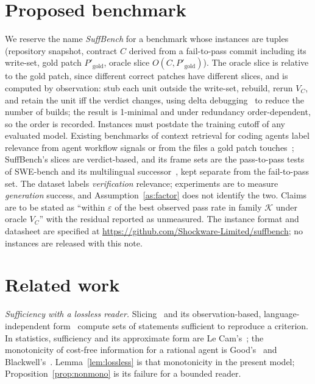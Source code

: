 \documentclass[10pt]{article}
\theoremstyle{definition}
\theoremstyle{plain}
\theoremstyle{remark}
\newcommand{\eps}{\varepsilon}
\newcommand{\Kfam}{\mathcal{K}}
\begin{document}
\section{Proposed benchmark}\label{sec:bench}

We reserve the name \emph{SuffBench} for a benchmark whose instances are tuples (repository snapshot, contract $C$ derived from a fail-to-pass commit including its write-set, gold patch $P'_{\text{gold}}$, oracle slice $O(C, P'_{\text{gold}})$). The oracle slice is relative to the gold patch, since different correct patches have different slices, and is computed by observation: stub each unit outside the write-set, rebuild, rerun $V_C$, and retain the unit iff the verdict changes, using delta debugging~\cite{zeller2002simplifying} to reduce the number of builds; the result is 1-minimal and under redundancy order-dependent, so the order is recorded. Instances must postdate the training cutoff of any evaluated model. Existing benchmarks of context retrieval for coding agents label relevance from agent workflow signals or from the files a gold patch touches~\cite{qin2026agentretrieval,li2026contextbench}; SuffBench's slices are verdict-based, and its frame sets are the pass-to-pass tests of SWE-bench and its multilingual successor~\cite{jimenez2023swebench,zan2025multiswebench}, kept separate from the fail-to-pass set. The dataset labels \emph{verification} relevance; experiments are to measure \emph{generation} success, and Assumption~\ref{as:factor} does not identify the two. Claims are to be stated as ``within $\eps$ of the best observed pass rate in family $\Kfam$ under oracle $V_C$'' with the residual reported as unmeasured. The instance format and datasheet are specified at \url{https://github.com/Shockware-Limited/suffbench}; no instances are released with this note.

\section{Related work}\label{sec:related}

\emph{Sufficiency with a lossless reader.} Slicing~\cite{weiser1984,horwitz1990} and its observation-based, language-independent form~\cite{binkley2014orbs} compute sets of statements sufficient to reproduce a criterion. In statistics, sufficiency and its approximate form are Le Cam's~\cite{lecam1964sufficiency}; the monotonicity of cost-free information for a rational agent is Good's~\cite{good1967total} and Blackwell's~\cite{blackwell1953equivalent}. Lemma~\ref{lem:lossless} is that monotonicity in the present model; Proposition~\ref{prop:nonmono} is its failure for a bounded reader.
\end{document}
